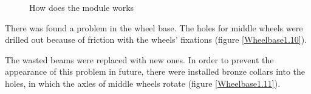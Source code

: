 \begin{figure}[H]
\begin{minipage}[h]{0.27\linewidth}
		\caption{How does the module works}
		\label{Hooks1.8}
	\end{minipage}
\end{figure}

There was found a problem in the wheel base. The holes for middle wheels were drilled out because of friction with the wheels' fixations (figure \ref{Wheelbase1.10}). 

The wasted beams were replaced with new ones. In order to prevent the appearance of this problem in future, there were installed bronze collars into the holes, in which the axles of middle wheels rotate (figure \ref{Wheelbase1.11}).

